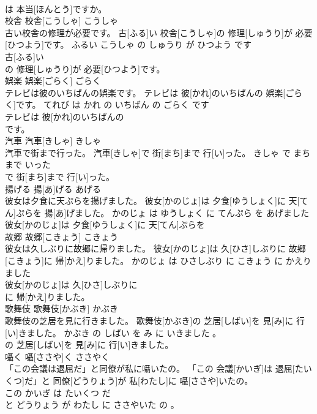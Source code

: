 \documentclass[8pt]{extreport}
\begin{document}
\begin{CJK}{UTF8}{min}
\\	は 本当[ほんとう]ですか。			
\\	校舎	校舎[こうしゃ]	こうしゃ	
\\	古い校舎の修理が必要です。	古[ふる]い 校舎[こうしゃ]の 修理[しゅうり]が 必要[ひつよう]です。	ふるい こうしゃ の しゅうり が ひつよう です	
\\	古[ふる]い
\\	の 修理[しゅうり]が 必要[ひつよう]です。			
\\	娯楽	娯楽[ごらく]	ごらく	
\\	テレビは彼のいちばんの娯楽です。	テレビは 彼[かれ]のいちばんの 娯楽[ごらく]です。	てれび は かれ の いちばん の ごらく です	
\\	テレビは 彼[かれ]のいちばんの
\\	です。			
\\	汽車	汽車[きしゃ]	きしゃ	
\\	汽車で街まで行った。	汽車[きしゃ]で 街[まち]まで 行[い]った。	きしゃ で まち まで いった	
\\	で 街[まち]まで 行[い]った。			
\\	揚げる	揚[あ]げる	あげる	
\\	彼女は夕食に天ぷらを揚げました。	彼女[かのじょ]は 夕食[ゆうしょく]に 天[てん]ぷらを 揚[あ]げました。	かのじょ は ゆうしょく に てんぷら を あげました	
\\	彼女[かのじょ]は 夕食[ゆうしょく]に 天[てん]ぷらを
\\	故郷	故郷[こきょう]	こきょう	
\\	彼女は久しぶりに故郷に帰りました。	彼女[かのじょ]は 久[ひさ]しぶりに 故郷[こきょう]に 帰[かえ]りました。	かのじょ は ひさしぶり に こきょう に かえりました	
\\	彼女[かのじょ]は 久[ひさ]しぶりに
\\	に 帰[かえ]りました。			
\\	歌舞伎	歌舞伎[かぶき]	かぶき	
\\	歌舞伎の芝居を見に行きました。	歌舞伎[かぶき]の 芝居[しばい]を 見[み]に 行[い]きました。	かぶき の しばい を み に いきました 。	
\\	の 芝居[しばい]を 見[み]に 行[い]きました。			
\\	囁く	囁[ささや]く	ささやく	
\\	「この会議は退屈だ」と同僚が私に囁いたの。	「この 会議[かいぎ]は 退屈[たいくつ]だ」と 同僚[どうりょう]が 私[わたし]に 囁[ささや]いたの。	
\\	この かいぎ は たいくつ だ 
\\	と どうりょう が わたし に ささやいた の 。	

\end{CJK}
\end{document}
